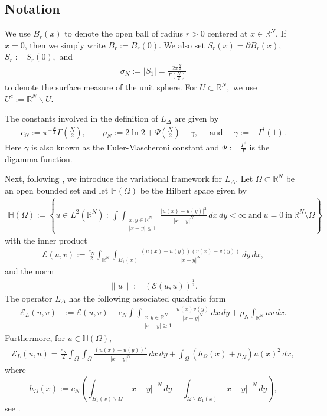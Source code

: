 \documentclass[11pt]{article}
\newcommand{\R}{\mathbb{R}}
\numberwithin{equation}{section}
\begin{document}
\subsection*{Notation}

We use $B_r(x)$ to denote the open ball of radius $r>0$ centered at $x\in \R^N$. If $x=0$, then we simply write $B_r:=B_r(0).$  We also set $S_r(x)=\partial B_r(x)$, $S_r:=S_r(0),$ and 
\begin{align*}
    \sigma_N:=|S_1|=\frac{2\pi^\frac{N}{2}}{\Gamma(\frac{N}{2})}
\end{align*}
to denote the surface measure of the unit sphere.  For $U\subset \R^N,$ we use $U^c:=\R^N\backslash U.$

The constants involved in the definition of $L_\Delta$ are given by
\begin{align}\label{rhon}
c_{N}:=\pi^{-\tfrac{N}{2}}\Gamma(\tfrac{N}{2}),\qquad \rho_{N}:=2\ln 2+\Psi(\tfrac{N}{2})-\gamma,\quad \text{ and }\quad\gamma:=-\Gamma^{\prime}(1).
\end{align}
Here $\gamma$ is also known as the Euler-Mascheroni constant and $\Psi:=\frac{\Gamma^{\prime}}{\Gamma}$ is the digamma function.

Next, following \cite{CW19}, we introduce the variational framework for $L_\Delta$. Let $\Omega \subset \mathbb{R}^N$ be an open bounded set and let $\mathbb{H}(\Omega)$ be the Hilbert space given by
\begin{align}\label{Hdef}
\mathbb{H}(\Omega):=\left\lbrace u\in L^{2}(\mathbb{R}^{N})~:~\int\int_{\substack{x,y\in\mathbb{R}^{N}\\ |x-y|\leq 1}}\frac{|u(x)-u(y)|^{2}}{|x-y|^{N}}\, dx\, dy<\infty~\mbox{and}~u=0~\mbox{in}~\mathbb{R}^{N}\setminus\Omega\right\rbrace
\end{align}
with the inner product 
\begin{align*}%
\mathcal{E}(u,v):=\frac{c_{N}}{2}\int_{\R^N}\int_{B_1(x)}\frac{(u(x)-u(y))(v(x)-v(y))}{|x-y|^{N}}\, dy\, dx,
\end{align*}
and the norm
\begin{align}\label{norm:def}
\|u\|:=\left(\mathcal{E}(u,u)\right)^{\tfrac{1}{2}}.    
\end{align}
The operator $L_{\Delta}$ has the following associated quadratic form 
\begin{align}\label{eq:bilog}
\mathcal{E}_{L}(u,v)
&:=\mathcal{E}(u,v)-c_{N}\int\int_{\substack{x,y\in\mathbb{R}^{N}\\ |x-y|\geq 1}}\frac{u(x)v(y)}{|x-y|^{N}}\, dx\, dy+\rho_{N}\int_{\mathbb{R}^{N}}uv\, dx.
\end{align}
Furthermore, for $u\in\mathbb H(\Omega)$,
\begin{align*}%
\mathcal{E}_{L}(u,u)=\frac{c_{N}}{2}\int_\Omega\int_\Omega \frac{(u(x)-u(y))^2}{|x-y|^{N}}\, dx\, dy
+\int_\Omega (h_\Omega(x)+\rho_N)u(x)^2\, dx,
\end{align*}
where 
\begin{equation}
\label{eq:h_omega}
h_\Omega(x):=c_N\left(\int_{B_1(x)\backslash \Omega}|x-y|^{-N}\, dy-\int_{ \Omega\backslash B_1(x)}|x-y|^{-N}\, dy\right),  
\end{equation}
see \cite[Proposition 3.2]{CW19}.  
\end{document}
